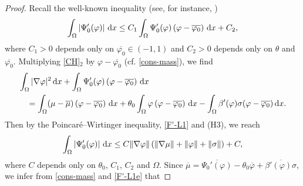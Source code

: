 \documentclass[11pt,reqno]{amsart}
\def\d{{\rm d}}
\begin{document}
\begin{proof}
Recall the well-known inequality (see, for instance, \cite{MZ04})
\begin{equation}
\label{F'-L1}
\int_{\Omega} \left|\Psi_0'(\varphi) \right| \, \d x \leq C_1 \int_{\Omega}\Psi_0'(\varphi) \left( \varphi-\overline{\varphi_{0}} \right) \, \d x+ C_2,
\end{equation}
%
where $C_1>0$ depends only on  $\overline{\varphi_{0}}\in (-1,1)$ and $C_2>0$ depends only on $\theta$ and $\overline{\varphi_{0}}$. Multiplying \eqref{CH}$_2$ by $\varphi - \overline{\varphi_{0}}$ (cf. \eqref{cons-mass}), we find
\begin{align*}
& \int_{\Omega} |\nabla \varphi|^2 \, \d x
+
\int_{\Omega}\Psi_0'(\varphi) \left( \varphi -\overline{\varphi_{0}} \right) \, \d x
\\
&\quad = \int_{\Omega} (\mu-\overline{\mu}) \left( \varphi -\overline{\varphi_{0}} \right) \, \d x + \theta_0 \int_{\Omega} \varphi \left( \varphi -\overline{\varphi_{0}} \right) \, \d x
-  \int_{\Omega} \beta'(\varphi)\sigma (\varphi-\overline{\varphi_0}) \, \d x.
\end{align*}
%
Then by the Poincar\'{e}--Wirtinger inequality, \eqref{F'-L1} and (H3), we reach
%
\begin{equation}
\label{F'-L1e}
 \int_{\Omega} \left|\Psi_0'(\varphi) \right| \, \d x  \leq
C \|\nabla \varphi\|\left(\| \nabla \mu\|+\|\varphi\| + \| \sigma\|\right) +C,
\end{equation}
%
where $C$ depends only on $\theta_0$, $C_1$, $C_2$ and $\Omega$. Since $\overline{\mu}= \overline{\Psi_0'(\varphi)}- \theta_0 \overline{\varphi}+  \overline{\beta'(\varphi)\sigma}$, we infer from \eqref{cons-mass} and \eqref{F'-L1e} that

\end{proof}
\end{document}
